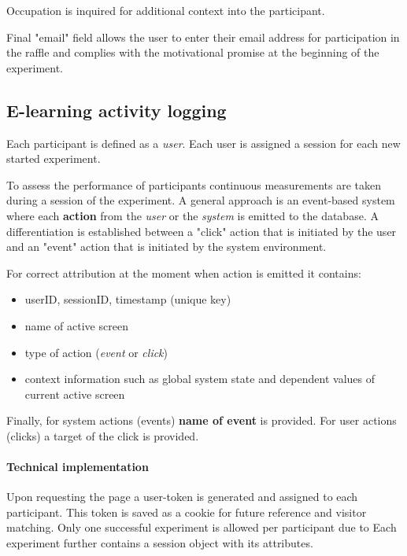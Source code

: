 	Occupation is inquired for additional context into the participant.
	
	Final "email" field allows the user to enter their email address for participation in the raffle and complies with the motivational promise at the beginning of the experiment.

	\subsection{E-learning activity logging} \label{sec:activitylog}
	
	Each participant is defined as a \textit{user}. Each user is assigned a session for each new started experiment. 
	
	To assess the performance of participants continuous measurements are taken during a session of the experiment. A general approach is an event-based system where each \textbf{action} from the \textit{user} or the \textit{system} is emitted to the database. A differentiation is established between a "click" action that is initiated by the user and an "event" action that is initiated by the system environment.
	
	For correct attribution at the moment when action is emitted it contains: 
	\begin{itemize}
		\item userID, sessionID, timestamp (unique key)
		\item name of active screen
		\item type of action (\textit{event} or \textit{click})
		\item context information such as global system state and dependent values of current active screen
	\end{itemize}

	Finally, for system actions (events) \textbf{name of event} is provided. For user actions (clicks) a target of the click is provided.
	

	

		
		\paragraph{Technical implementation}
		
		Upon requesting the page a user-token is generated and assigned to each participant. This token is saved as a cookie for future reference and visitor matching. Only one successful experiment is allowed per participant due to 
		Each experiment further contains a session object with its attributes. 
		
